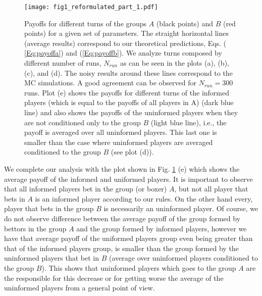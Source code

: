 \documentclass[3p, 11pt]{elsarticle}
\begin{document}
\begin{figure}[h]
\begin{center}
\texttt{[image: fig1\_reformulated\_part\_1.pdf]}
\end{center}
\caption{Payoffs for different turns of the groups $A$ (black points) and $B$
(red points) for a given set of parameters. The straight horizontal lines
(average results) correspond to our theoretical predictions, Eqs. (\protect
\ref{Eq:payoffa}) and (\protect\ref{Eq:payoffb}). We analyze turns composed
by different number of runs, $N_{run}$ as can be seen in the plots (a), (b),
(c), and (d). The noisy results around these lines correspond to the MC
simulations. A good agreement can be observed for $N_{run}=300$ runs. Plot
(e) shows the payoffs for different turns of the informed players (which is
equal to the payoffs of all players in A) (dark blue line) and also shows
the payoffs of the uninformed players when they are not conditioned only to
the group $B$ (light blue line), i.e., the payoff is averaged over all
uninformed players. This last one is smaller than the case where uninformed
players are averaged conditioned to the group $B$ (see plot (d)).}
\label{Fig:MCXtheory}
\end{figure}
We complete our analysis with the plot shown in Fig. \ref{Fig:MCXtheory} (e)
which shows the average payoff of the informed and uniformed players. It is
important to observe that all informed players bet in the group (or boxer) $%
A $, but not all player that bets in $A$ is an informed player according to
our rules. On the other hand every, player that bets in the group $B$ is
necessarily an uninformed player. Of course, we do not observe difference
between the average payoff of the group formed by bettors in the group $A$
and the group formed by informed players, however we have that average
payoff of the uniformed players group even being greater than that of the
informed players group, is smaller than the group formed by the uninformed
players that bet in $B$ (average over uninformed players conditioned to the
group $B$). This shows that uninformed players which goes to the group $A$
are the responsible for this decrease or for getting worse the average of
the uninformed players from a general point of view.
\end{document}
